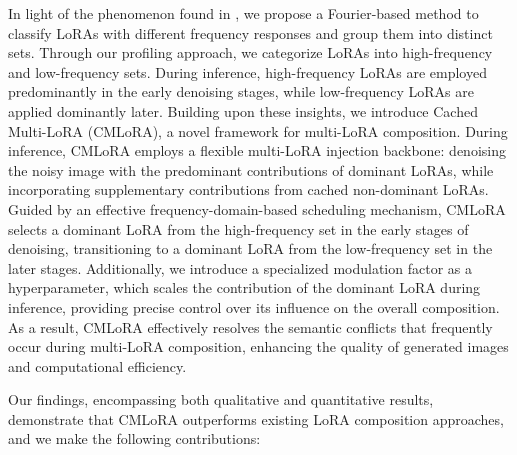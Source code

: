 In light of the phenomenon found in , we propose a Fourier-based method to classify LoRAs with different frequency responses and group them into distinct sets. Through our profiling approach, we categorize LoRAs into high-frequency and low-frequency sets. During inference, high-frequency LoRAs are employed predominantly in the early denoising stages, while low-frequency LoRAs are applied dominantly later. Building upon these insights, we introduce Cached Multi-LoRA (CMLoRA), a novel framework for multi-LoRA composition. During inference, CMLoRA employs a flexible multi-LoRA injection backbone: denoising the noisy image with the predominant contributions of dominant LoRAs, while incorporating supplementary contributions from cached non-dominant LoRAs. Guided by an effective frequency-domain-based scheduling mechanism, CMLoRA selects a dominant LoRA from the high-frequency set in the early stages of denoising, transitioning to a dominant LoRA from the low-frequency set in the later stages. Additionally, we introduce a specialized modulation factor as a hyperparameter, which scales the contribution of the dominant LoRA during inference, providing precise control over its influence on the overall composition. As a result, CMLoRA effectively resolves the semantic conflicts that frequently occur during multi-LoRA composition, enhancing the quality of generated images and computational efficiency.

Our findings, encompassing both qualitative and quantitative results, demonstrate that CMLoRA outperforms existing LoRA composition approaches, and we make the following contributions:

